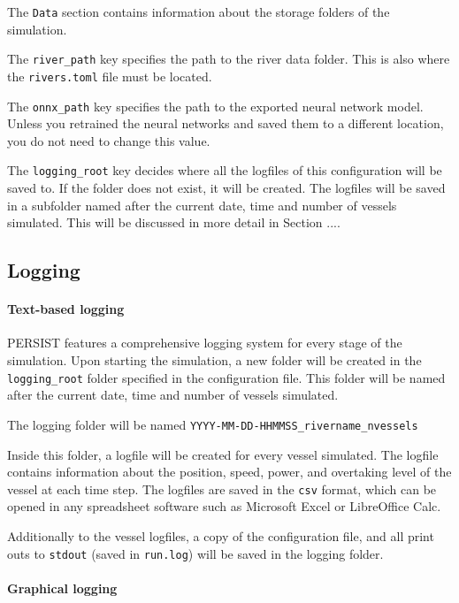 \documentclass[
	a4paper, %
	12pt, %
]{persist}
\begin{document}
The \verb|Data| section contains information about the storage folders of the simulation.

The \verb|river_path| key specifies the path to the river data folder. This is also where the \verb|rivers.toml| file must be located.

The \verb|onnx_path| key specifies the path to the exported neural network model. Unless you retrained the neural networks and saved them to a different location, you do not need to change this value.

The \verb|logging_root| key decides where all the logfiles of this configuration will be saved to. If the folder does not exist, it will be created. The logfiles will be saved in a subfolder named after the current date, time and number of vessels simulated. This will be discussed in more detail in Section ....

\subsection{Logging}

\paragraph{Text-based logging}

PERSIST features a comprehensive logging system for every stage of the simulation. Upon starting the simulation, a new folder will be created in the \verb|logging_root| folder specified in the configuration file. This folder will be named after the current date, time and number of vessels simulated. 
\begin{note}
	The logging folder will be named \verb|YYYY-MM-DD-HHMMSS_rivername_nvessels|
\end{note}

Inside this folder, a logfile will be created for every vessel simulated. The logfile contains information about the position, speed, power, and overtaking level of the vessel at each time step. The logfiles are saved in the \verb|csv| format, which can be opened in any spreadsheet software such as Microsoft Excel or LibreOffice Calc.

Additionally to the vessel logfiles, a copy of the configuration file, and all print outs to \verb|stdout| (saved in \verb|run.log|) will be saved in the logging folder. 

\paragraph{Graphical logging}
\end{document}
